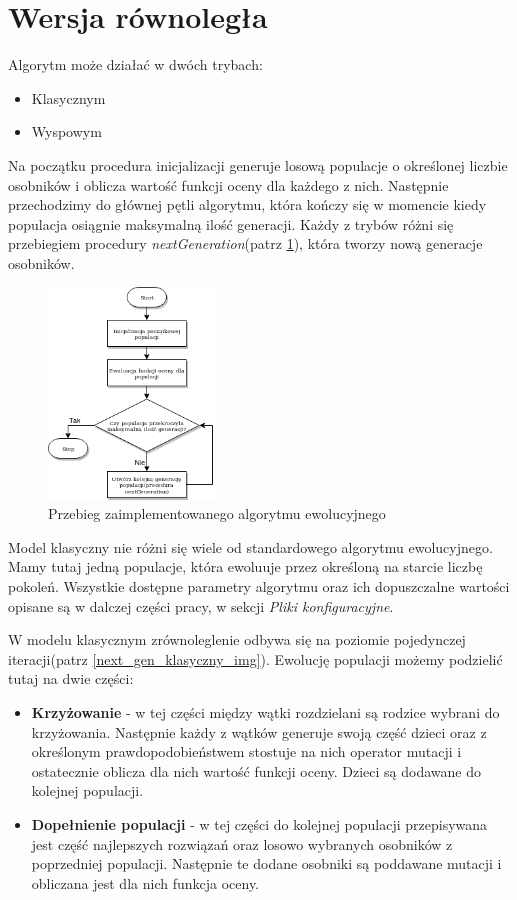 \section{Wersja równoległa}
Algorytm może działać w dwóch trybach:
\begin{itemize}
    \item Klasycznym
    \item Wyspowym
\end{itemize}

Na początku procedura inicjalizacji generuje losową populacje o określonej liczbie osobników i oblicza wartość funkcji oceny dla każdego z nich. 
Następnie przechodzimy do głównej pętli algorytmu, która kończy się w momencie kiedy populacja osiągnie maksymalną ilość generacji. 
Każdy z trybów różni się przebiegiem procedury \textit{nextGeneration}(patrz \ref{alg_main_img}), która tworzy nową generacje osobników.

\begin{figure}[H]
    \centering        
    \includegraphics[width=0.4\textwidth]{img/alg_main.png}
    \caption{Przebieg zaimplementowanego algorytmu ewolucyjnego}
    \label{alg_main_img}
\end{figure}

Model klasyczny nie różni się wiele od standardowego algorytmu ewolucyjnego. Mamy tutaj jedną populacje, która ewoluuje przez 
określoną na starcie liczbę pokoleń. Wszystkie dostępne parametry algorytmu oraz ich dopuszczalne wartości opisane są w dalczej części pracy, 
w sekcji \textit{Pliki konfiguracyjne}.

W modelu klasycznym zrównoleglenie odbywa się na poziomie pojedynczej iteracji(patrz \ref{next_gen_klasyczny_img}). 
Ewolucję populacji możemy podzielić tutaj na dwie części:
\begin{itemize}
    \item \textbf{Krzyżowanie} - w tej części między wątki rozdzielani są rodzice wybrani do krzyżowania. Następnie każdy z wątków generuje swoją część 
    dzieci oraz z określonym prawdopodobieństwem stostuje na nich operator mutacji i ostatecznie oblicza dla nich wartość funkcji oceny. 
    Dzieci są dodawane do kolejnej populacji.
    \item \textbf{Dopełnienie populacji} - w tej części do kolejnej populacji przepisywana jest część najlepszych rozwiązań oraz losowo wybranych osobników 
    z poprzedniej populacji. Następnie te dodane osobniki są poddawane mutacji i obliczana jest dla nich funkcja oceny.
\end{itemize}

